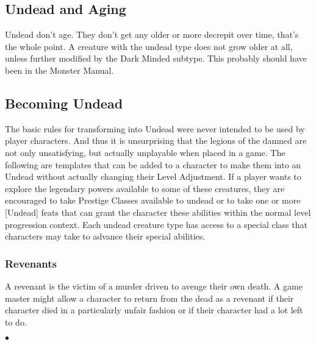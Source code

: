 \subsection{Undead and Aging}


Undead don't age. They don't get any older or more decrepit over time, that's the whole point. A creature with the undead type does not grow older at all, unless further modified by the Dark Minded subtype. This probably should have been in the Monster Manual.


\subsection{Becoming Undead}

The basic rules for transforming into Undead were never intended to be used by player characters. And thus it is unsurprising that the legions of the damned are not only unsatisfying, but actually unplayable when placed in a game. The following are templates that can be added to a character to make them into an Undead without actually changing their Level Adjustment. If a player wants to explore the legendary powers available to some of these creatures, they are encouraged to take Prestige Classes available to undead or to take one or more [Undead] feats that can grant the character these abilities within the normal level progression context. Each undead creature type has access to a special class that characters may take to advance their special abilities.

\subsubsection{Revenants}\label{undead:revenant}
\vspace*{-8pt}

A revenant is the victim of a murder driven to avenge their own death. A game master might allow a character to return from the dead as a revenant if their character died in a particularly unfair fashion or if their character had a lot left to do.

\begin{list}{$\bullet$}{\itemspace}
\end{list}

